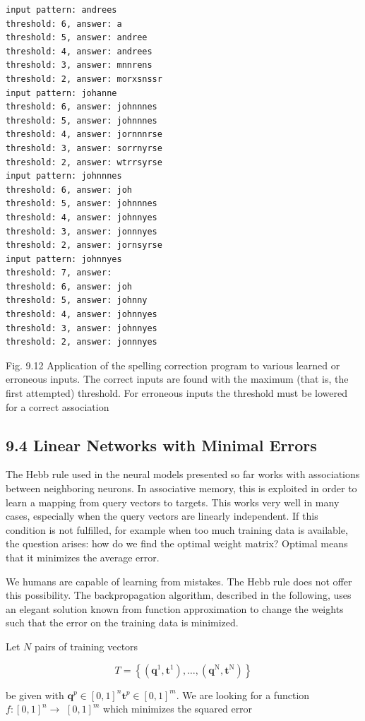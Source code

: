 \documentclass[10pt]{article}
\begin{document}
\begin{verbatim}
input pattern: andrees
threshold: 6, answer: a
threshold: 5, answer: andree
threshold: 4, answer: andrees
threshold: 3, answer: mnnrens
threshold: 2, answer: morxsnssr
input pattern: johanne
threshold: 6, answer: johnnnes
threshold: 5, answer: johnnnes
threshold: 4, answer: jornnnrse
threshold: 3, answer: sorrnyrse
threshold: 2, answer: wtrrsyrse
input pattern: johnnnes
threshold: 6, answer: joh
threshold: 5, answer: johnnnes
threshold: 4, answer: johnnyes
threshold: 3, answer: jonnnyes
threshold: 2, answer: jornsyrse
input pattern: johnnyes
threshold: 7, answer:
threshold: 6, answer: joh
threshold: 5, answer: johnny
threshold: 4, answer: johnnyes
threshold: 3, answer: johnnyes
threshold: 2, answer: jonnnyes
\end{verbatim}

Fig. 9.12 Application of the spelling correction program to various learned or erroneous inputs. The correct inputs are found with the maximum (that is, the first attempted) threshold. For erroneous inputs the threshold must be lowered for a correct association

\subsection*{9.4 Linear Networks with Minimal Errors}
The Hebb rule used in the neural models presented so far works with associations between neighboring neurons. In associative memory, this is exploited in order to learn a mapping from query vectors to targets. This works very well in many cases, especially when the query vectors are linearly independent. If this condition is not fulfilled, for example when too much training data is available, the question arises: how do we find the optimal weight matrix? Optimal means that it minimizes the average error.


We humans are capable of learning from mistakes. The Hebb rule does not offer this possibility. The backpropagation algorithm, described in the following, uses an elegant solution known from function approximation to change the weights such that the error on the training data is minimized.

Let $N$ pairs of training vectors

$$
T=\left\{\left(\boldsymbol{q}^{1}, \boldsymbol{t}^{1}\right), \ldots,\left(\boldsymbol{q}^{\mathrm{N}}, \boldsymbol{t}^{\mathrm{N}}\right)\right\}
$$

be given with $\boldsymbol{q}^{p} \in[0,1]^{n} \boldsymbol{t}^{p} \in[0,1]^{m}$. We are looking for a function $f:[0,1]^{n} \rightarrow$ $[0,1]^{m}$ which minimizes the squared error
\end{document}
